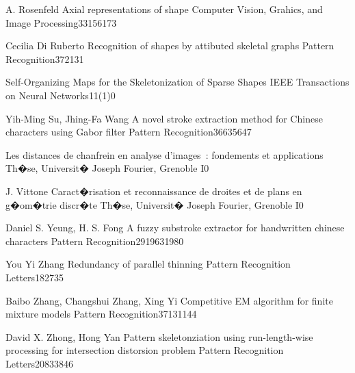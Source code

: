  {A.  Rosenfeld}
{Axial representations of shape}
{Computer Vision, Grahics, and Image Processing}{33}{156}{173}

 {Cecilia Di Ruberto}
{Recognition of shapes by attibuted skeletal graphs}
{Pattern Recognition}{37}{21}{31}

{Self-Organizing Maps for the Skeletonization of Sparse Shapes}
{IEEE Transactions on Neural Networks}{11(1)}{0}{}

 {Yih-Ming Su, Jhing-Fa Wang}
{A novel stroke extraction method for Chinese characters using Gabor filter}
{Pattern Recognition}{36}{635}{647}

{Les distances de chanfrein en analyse d'images~: fondements et applications}
{Th�se, Universit� Joseph Fourier, Grenoble I}{}{0}{}

 {J. Vittone}
{Caract�risation et reconnaissance de droites et de plans en g�om�trie discr�te}
{Th�se, Universit� Joseph Fourier, Grenoble I}{}{0}{}

 {Daniel S. Yeung, H. S. Fong}
{A fuzzy substroke extractor for handwritten chinese characters}
{Pattern Recognition}{29}{1963}{1980}

 {You Yi Zhang}
{Redundancy of parallel thinning}
{Pattern Recognition Letters}{18}{27}{35}

 {Baibo Zhang, Changshui Zhang, Xing Yi}
{Competitive EM algorithm for finite mixture models}
{Pattern Recognition}{37}{131}{144}

 {David X. Zhong, Hong Yan}
{Pattern skeletonziation using run-length-wise processing for intersection distorsion problem}
{Pattern Recognition Letters}{20}{833}{846}


